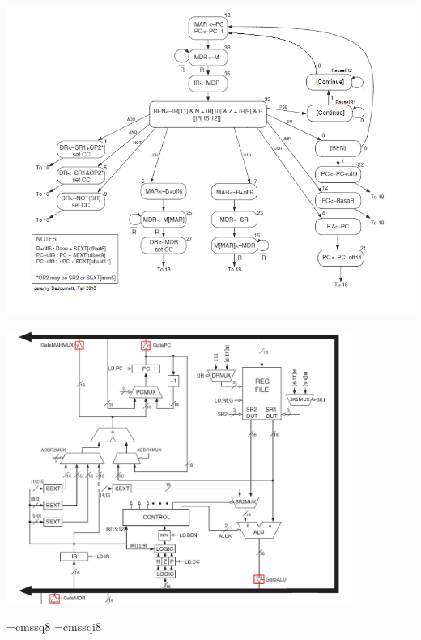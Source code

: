 \documentclass[aspectratio=169, 11pt, handout]{beamer}
\begin{document}
\begin{frame}{}
    \begin{center}
        \includegraphics[width=\textwidth]{statediagram.png}
    \end{center} 
\end{frame}

\begin{frame}{}
    \begin{center}
        \includegraphics[width=0.85\textwidth]{SLC3_updated.png}
    \end{center}
\end{frame}

\font\eightss=cmssq8
\font\eightssi=cmssqi8
\newcommand\quoteAuthorDate[3]{\begingroup
  \baselineskip 10pt
  \parfillskip 0pt
  \interlinepenalty 10000 %
  \leftskip 0pt plus 40pc minus \parindent
  \let\rm=\eightss
  \let\sl=\eightssi
  \everypar{\sl}#1\par
  \nobreak\smallskip
  \noindent\rm--- #2\unskip\enspace(#3)\par
  \endgroup}
\end{document}

